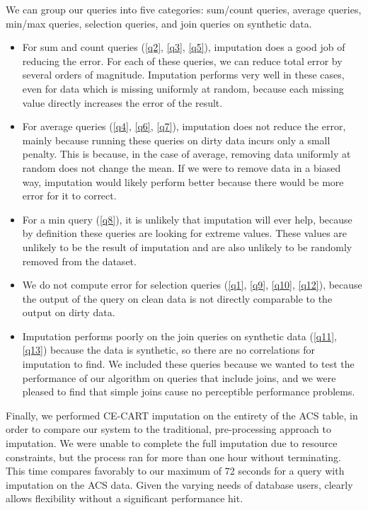 We can group our queries into five categories: sum/count queries, average queries, min/max queries, selection queries, and join queries on synthetic data.

\begin{itemize}
\item For sum and count queries (\ref{q2}, \ref{q3}, \ref{q5}), imputation does a good job of reducing the error.
For each of these queries, we can reduce total error by several orders of magnitude.
Imputation performs very well in these cases, even for data which is missing uniformly at random, because each missing value directly increases the error of the result.

\item For average queries (\ref{q4}, \ref{q6}, \ref{q7}), imputation does not reduce the error, mainly because running these queries on dirty data incurs only a small penalty.
This is because, in the case of average, removing data uniformly at random does not change the mean.
If we were to remove data in a biased way, imputation would likely perform better because there would be more error for it to correct.

\item For a min query (\ref{q8}), it is unlikely that imputation will ever help, because by definition these queries are looking for extreme values.
These values are unlikely to be the result of imputation and are also unlikely to be randomly removed from the dataset.

\item We do not compute error for selection queries (\ref{q1}, \ref{q9}, \ref{q10}, \ref{q12}), because the output of the query on clean data is not directly comparable to the output on dirty data.

  \item Imputation performs poorly on the join queries on synthetic data (\ref{q11}, \ref{q13}) because the data is synthetic, so there are no correlations for imputation to find. We included these queries because we wanted to test the performance of our algorithm on queries that include joins, and we were pleased to find that simple joins cause no perceptible performance problems.
\end{itemize}

Finally, we performed CE-CART imputation on the entirety of the ACS table, in order to compare our system to the traditional, pre-processing approach to imputation.
We were unable to complete the full imputation due to resource constraints, but the process ran for more than one hour without terminating.
This time compares favorably to our maximum of 72 seconds for a query with imputation on the ACS data.
Given the varying needs of database users, \ProjectName{} clearly allows flexibility without a significant performance hit.


